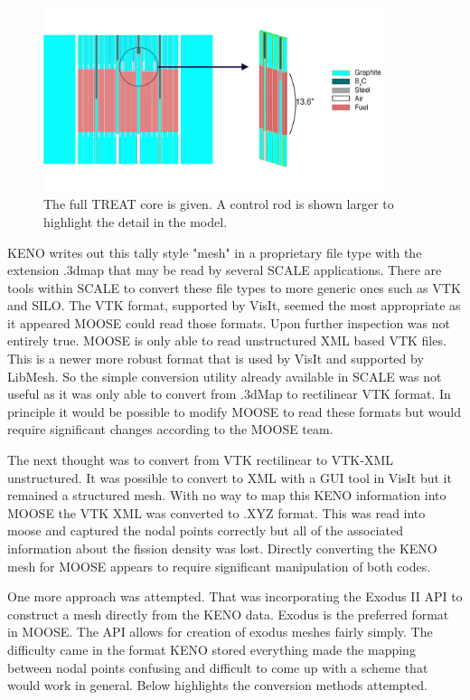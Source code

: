 \documentclass[11pt]{article}
\begin{document}
\begin{figure}
    \centering
    \includegraphics[width=10cm]{figures/big_to_small}
    \caption{The full TREAT core is given.  A control rod is shown larger to highlight the detail in the model.}
    \label{fig:treat3d}
\end{figure}

KENO writes out this tally style "mesh" in a proprietary file type with the extension .3dmap that may be read by several SCALE applications.  There are tools within SCALE to convert these file types to more generic ones such as VTK and SILO.  The VTK format, supported by VisIt, seemed the most appropriate as it appeared MOOSE could read those formats.  Upon further inspection was not entirely true. MOOSE is only able to read unstructured XML based VTK files.  This is a newer more robust format that is used by VisIt and supported by LibMesh.  So the simple conversion utility already available in SCALE was not useful as it was only able to convert from .3dMap to rectilinear VTK format.  In principle it would be possible to modify MOOSE to read these formats but would require significant changes according to the MOOSE team.  

The next thought was to convert from VTK rectilinear to VTK-XML unstructured.  It was possible to convert to XML with a GUI tool in VisIt but it remained a structured mesh.  With no way to map this KENO information into MOOSE the VTK XML was converted to .XYZ format.  This was read into moose and captured the nodal points correctly but all of the associated information about the fission density was lost. Directly converting the KENO mesh for MOOSE appears to require significant manipulation of both codes.

One more approach was attempted. That was incorporating the Exodus II API to construct a mesh directly from the KENO data.  Exodus is the preferred format in MOOSE.  The API allows for creation of exodus meshes fairly simply.  The difficulty came in the format KENO stored everything made the mapping between nodal points confusing and difficult to come up with a scheme that would work in general.  
Below highlights the conversion methods attempted.
\end{document}
